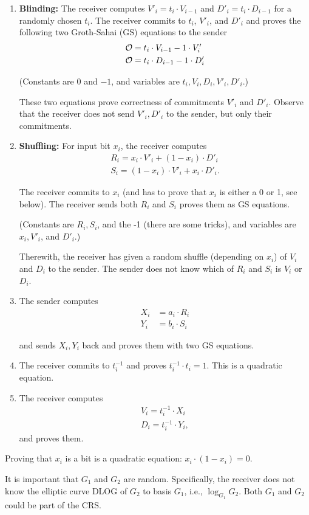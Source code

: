 \documentclass{article}
\begin{document}
\begin{enumerate}
\item {\bf Blinding:} The receiver computes $V'_i = t_i\cdot{}V_{i-1}$ and
  $D'_i=t_i \cdot D_{i-1}$ for a randomly chosen $t_i$. The receiver
  commits to $t_i$, $V'_i$, and $D'_i$ and proves the following two
  Groth-Sahai (GS) equations to the sender
\begin{align}
  \mathcal{O} &= t_i \cdot V_{i-1} - 1 \cdot V'_i \\
  \mathcal{O} &= t_i \cdot D_{i-1} - 1\cdot{}D'_i
\end{align}

      (Constants are $0$ and $-1$, and variables are $t_i, V_i, D_i,
      V'_i, D'_i$.)

      These two equations prove correctness of commitments $V'_i$ and
      $D'_i$. Observe that the receiver does not send $V'_i,D'_i$ to
      the sender, but only their commitments.

    \item {\bf Shuffling:} For input bit $x_i$, the receiver computes
      \begin{align}
        R_i = x_i \cdot V'_i + (1-x_i) \cdot D'_i
        \\S_i = (1-x_i) \cdot V'_i + x_i \cdot D'_i.
      \end{align}

      The receiver
      commits to $x_i$ (and has to prove that $x_i$ is either a 0 or
      1, see below). The receiver sends both $R_i$ and $S_i$ proves them as GS equations.

      (Constants are $R_i,S_i$, and
      the -1 (there are some tricks), and variables are $x_i, V'_i$, and
      $D'_i$.)

      Therewith, the receiver has given a random shuffle (depending on
      $x_i$) of $V_i$ and $D_i$ to the sender. The sender does not
      know which of $R_i$ and $S_i$ is $V_i$ or $D_i$.
      
    \item The sender computes \begin{align}
                                X_i &= a_i \cdot R_i\\
                                Y_i &= b_i \cdot S_i
                                \end{align}

                                and sends $X_i,Y_i$ back and proves
                                them with two GS equations.

                              \item The receiver commits to $t_i^{-1}$
                                and proves $t_i^{-1}\cdot{}t_i = 1$. This is a quadratic equation.


                              \item The receiver computes
\begin{align}
  V_{i} = t_i^{-1} \cdot X_i\\
  D_{i} = t_i^{-1} \cdot Y_i,
\end{align}
and proves them.


\end{enumerate}

Proving that $x_i$ is a bit is a quadratic equation:
$x_i \cdot (1-x_i) = 0$.


It is important that $G_1$ and $G_2$ are random. Specifically, the
receiver does not know the elliptic curve DLOG of $G_2$ to basis
$G_1$, i.e., $\log_{G_1}{G_2}$. Both $G_1$ and $G_2$ could be part of
the CRS.
\end{document}
